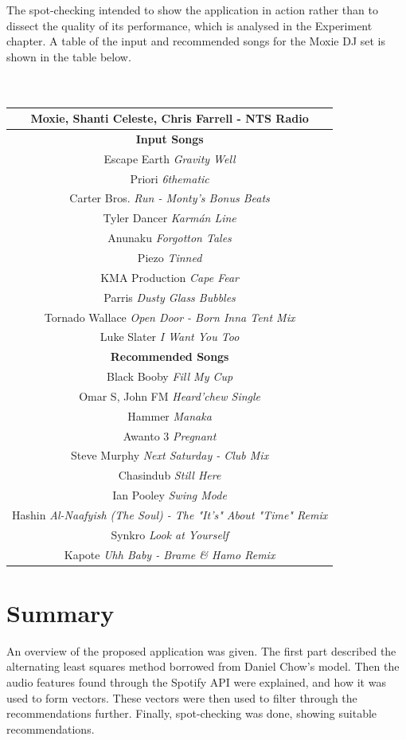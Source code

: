 The spot-checking intended to show the application in action rather than to dissect the quality of its performance, which is analysed in the Experiment chapter. A table of the input and recommended songs for the Moxie DJ set is shown in the table below.
\\
\\
\\
\begin{center}
	\begin{tabular}{ |c|} 
		\hline
		\textbf{Moxie, Shanti Celeste, Chris Farrell - NTS Radio}\\ 
		\hline \textbf{Input Songs}\\ 
		\hline Escape Earth \textit{Gravity Well} \\ 
		\hline Priori \textit{6thematic }\\
		\hline Carter Bros. \textit{Run - Monty's Bonus Beats}\\
		\hline Tyler Dancer \textit{Karmán Line}\\ 
		\hline Anunaku \textit{Forgotton Tales}\\
		\hline Piezo \textit{Tinned}\\
		\hline KMA Production \textit{Cape Fear}\\
		\hline Parris \textit{Dusty Glass Bubbles}\\
		\hline Tornado Wallace \textit{Open Door - Born Inna Tent Mix}\\
		\hline Luke Slater \textit{I Want You Too}\\
		\hline \textbf{Recommended Songs}\\ 
		\hline Black Booby \textit{Fill My Cup}\\
		\hline Omar S, John FM \textit{Heard'chew Single}\\
		\hline Hammer \textit{Manaka}\\
		\hline Awanto 3 \textit{Pregnant}\\
		\hline Steve Murphy \textit{Next Saturday - Club Mix}\\
		\hline Chasindub \textit{Still Here}\\
		\hline Ian Pooley \textit{Swing Mode}\\
		\hline Hashin \textit{Al-Naafyish (The Soul) - The "It's" About "Time" Remix}\\
		\hline Synkro \textit{Look at Yourself}\\
		\hline Kapote \textit{Uhh Baby - Brame \& Hamo Remix}\\
		\hline
	\end{tabular}
\end{center}


\section{Summary}
An overview of the proposed application was given. The first part described the alternating least squares method borrowed from Daniel Chow's model. Then the audio features found through the Spotify API were explained, and how it was used to form vectors. These vectors were then used to filter through the recommendations further. Finally, spot-checking was done, showing suitable recommendations.


